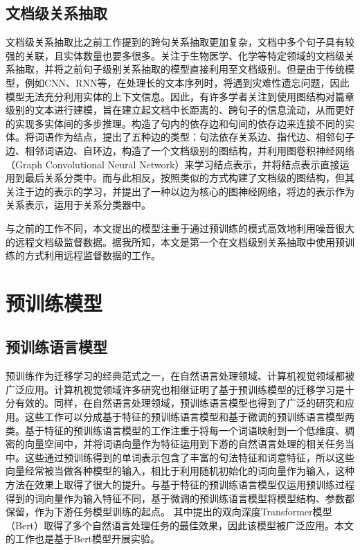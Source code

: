 \subsection{文档级关系抽取}
文档级关系抽取比之前工作提到的跨句关系抽取更加复杂，文档中多个句子具有较强的关联，且实体数量也要多很多。\citet{nguyen2018convolutional,li2018chemical}关注于生物医学、化学等特定领域的文档级关系抽取，并将之前句子级别关系抽取的模型直接利用至文档级别。但是由于传统模型，例如CNN、RNN等，在处理长的文本序列时，将遇到灾难性遗忘问题，因此模型无法充分利用实体的上下文信息。因此，有许多学者关注到使用图结构对篇章级别的文本进行建模，旨在建立起文档中长距离的、跨句子的信息流动，从而更好的实现多实体间的多步推理。\citet{quirk2017distant}构造了句内的依存边和句间的依存边来连接不同的实体。\citet{sahu2019inter}将词语作为结点，提出了五种边的类型：句法依存关系边、指代边、相邻句子边、相邻词语边、自环边，构造了一个文档级别的图结构，并利用图卷积神经网络（Graph Convolutional Neural Network）来学习结点表示，并将结点表示直接运用到最后关系分类中。而与此相反，\citet{christopoulou2019connecting}按照类似的方式构建了文档级的图结构，但其关注于边的表示的学习，并提出了一种以边为核心的图神经网络，将边的表示作为关系表示，运用于关系分类器中。

与之前的工作不同，本文提出的模型注重于通过预训练的模式高效地利用噪音很大的远程文档级监督数据。据我所知，本文是第一个在文档级别关系抽取中使用预训练的方式利用远程监督数据的工作。



\section{预训练模型}
\subsection{预训练语言模型}
预训练作为迁移学习的经典范式之一，在自然语言处理领域、计算机视觉领域都被广泛应用。计算机视觉领域许多研究也相继证明了基于预训练模型的迁移学习是十分有效的\cite{deng2009imagenet,yosinski2014transferable}。同样，在自然语言处理领域，预训练语言模型也得到了广泛的研究和应用。这些工作可以分成基于特征的预训练语言模型和基于微调的预训练语言模型两类。基于特征的预训练语言模型的工作\cite{mikolov2013distributed,pennington2014glove,peters2018deep}注重于将每一个词语映射到一个低维度、稠密的向量空间中，并将词语向量作为特征运用到下游的自然语言处理的相关任务当中。这些通过预训练得到的单词表示包含了丰富的句法特征和词意特征，所以这些向量经常被当做各种模型的输入，相比于利用随机初始化的词向量作为输入，这种方法在效果上取得了很大的提升。与基于特征的预训练语言模型仅运用预训练过程得到的词向量作为输入特征不同，基于微调的预训练语言模型将模型结构、参数都保留，作为下游任务模型训练的起点\cite{dai2015semi,howard2018universal,merity2017regularizing,devlin2019bert}。
其中\citet{devlin2019bert}提出的双向深度Transformer模型（Bert）取得了多个自然语言处理任务的最佳效果，因此该模型被广泛应用。本文的工作也是基于Bert模型开展实验。

